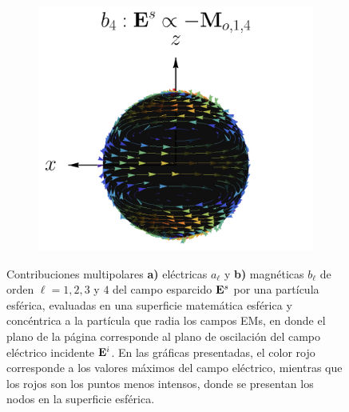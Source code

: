 \begin{figure}[h!]
\begin{subfigure}{.9\linewidth}
		\includegraphics[scale=.25]{1-Teoria/figs/Mo14_static_crop.png}%
		\end{subfigure}
		\caption{Contribuciones multipolares \textbf{a)} eléctricas $a_\ell$ y \textbf{b)} magnéticas $b_\ell$ de orden $\ell = 1,2,3$ y $4$ del campo esparcido $\vb{E}^s$ por una partícula esférica, evaluadas en una superficie matemática esférica y concéntrica a la partícula que radia los campos EMs, en donde el plano de la página corresponde al plano de oscilación del campo eléctrico incidente $\vb{E}^i$. En las gráficas presentadas, el color rojo corresponde a los valores máximos del campo eléctrico, mientras que los rojos son los puntos menos intensos, donde se presentan los nodos en la superficie esférica.}
		\label{fig:Multipolos}
	\end{figure}

